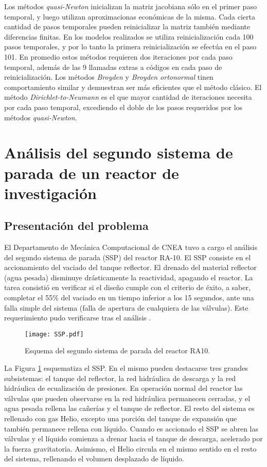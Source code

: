 Los métodos \textit{quasi-Newton} inicializan la matriz jacobiana sólo en el primer paso temporal,
y luego utilizan aproximacionas económicas de la misma. 
Cada cierta cantidad de pasos temporales pueden reinicializar la matriz también mediante diferencias finitas. 
En los modelos realizados se utiliza reinicialización cada 100 pasos temporales, 
y por lo tanto la primera reinicialización se efectúa en el paso 101.
En promedio estos métodos requieren dos iteraciones por cada paso temporal, 
además de las 9 llamadas extras a códigos en cada paso de reinicialización.
Los métodos \textit{Broyden} y \textit{Broyden ortonormal} tinen comportamiento similar y demuestran ser más eficientes que el método clásico.
El método \textit{Dirichlet-to-Neumann} es el que mayor cantidad de iteraciones necesita por cada paso temporal, 
excediendo el doble de los pasos requeridos por los métodos \textit{quasi-Newton}.

\section{Análisis del segundo sistema de parada de un reactor de investigación}
\label{3:mock-up}

\subsection*{Presentación del problema}
El Departamento de Mecánica Computacional de CNEA tuvo a cargo el análisis del segundo sistema de parada (SSP) del reactor RA-10.
El SSP consiste en el accionamiento del vaciado del tanque reflector.
El drenado del material reflector (agua pesada) disminuye drásticamente la reactividad, apagando el reactor.
La tarea consistió en verificar si el diseño cumple con el criterio de éxito,
a saber, completar el 55\% del vaciado en un tiempo inferior a los 15 segundos,
ante una falla simple del sistema (falla de apertura de cualquiera de las válvulas).
Este requerimiento pudo verificarse tras el análisis \cite{cnea-informe-ra10}.

\begin{figure}[ht]
\centering{}\texttt{[image: SSP.pdf]}
\caption{Esquema del segundo sistema de parada del reactor RA10.} \label{fig:SSP} 
\end{figure}

La Figura \ref{fig:SSP} esquematiza el SSP. 
En el mismo pueden destacarse tres grandes subsistemas: el tanque del reflector, la red hidráulica de descarga y
la red hidráulica de ecualización de presiones. 
En operación normal del reactor las
válvulas que pueden observarse en la red hidráulica permanecen cerradas, y el agua pesada rellena las cañerías y el tanque de reflector. 
El resto del sistema es rellenado con gas Helio, excepto una porción del tanque de expansión que también permanece rellena con líquido. 
Cuando es accionado el SSP se abren las válvulas y el líquido comienza a drenar hacia el tanque de descarga, acelerado por la fuerza gravitatoria. 
Asimismo, el Helio circula en el mismo sentido en el resto del sistema, rellenando el volumen desplazado de líquido.

